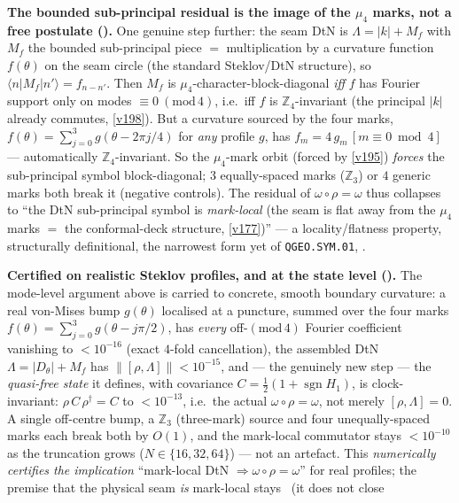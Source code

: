\documentclass[11pt,a4paper]{article}
\newcommand{\Z}{\mathbb Z}
\begin{document}
\begin{keybox}
\par\smallskip\noindent\textbf{The bounded sub-principal residual is the image of the $\mu_4$ marks, not a
free postulate ().} One genuine step further: the seam DtN is
$\Lambda=|k|+M_f$ with $M_f$ the bounded sub-principal piece $=$ multiplication by a curvature function
$f(\theta)$ on the seam circle (the standard Steklov/DtN structure), so $\langle n|M_f|n'\rangle=f_{n-n'}$.
Then $M_f$ is $\mu_4$-character-block-diagonal \emph{iff} $f$ has Fourier support only on modes
$\equiv0\ (\mathrm{mod}\,4)$, i.e.\ iff $f$ is $\Z_4$-invariant (the principal $|k|$ already commutes,
\vref{v198}). But a curvature sourced by the four marks, $f(\theta)=\sum_{j=0}^{3}g(\theta-2\pi j/4)$ for
\emph{any} profile $g$, has $f_m=4\,g_m\,[m\equiv0\bmod4]$ --- automatically $\Z_4$-invariant. So the
$\mu_4$-mark orbit (forced by \vref{v195}) \emph{forces} the sub-principal symbol block-diagonal; $3$
equally-spaced marks ($\Z_3$) or $4$ generic marks both break it (negative controls). The residual of
$\omega\circ\rho=\omega$ thus collapses to ``the DtN sub-principal symbol is \emph{mark-local} (the seam is
flat away from the $\mu_4$ marks $=$ the conformal-deck structure, \vref{v177})'' --- a locality/flatness
property, structurally definitional, the narrowest form yet of \texttt{QGEO.SYM.01}, \mO.
\par\smallskip\noindent\textbf{Certified on realistic Steklov profiles, and at the state level
().} The mode-level argument above is carried to concrete, smooth boundary
curvature: a real von-Mises bump $g(\theta)$ localised at a puncture, summed over the four marks
$f(\theta)=\sum_{j=0}^{3}g(\theta-j\pi/2)$, has \emph{every} off-$(\mathrm{mod}\,4)$ Fourier coefficient
vanishing to $<10^{-16}$ (exact $4$-fold cancellation), the assembled DtN $\Lambda=|D_\theta|+M_f$ has
$\|[\rho,\Lambda]\|<10^{-15}$, and --- the genuinely new step --- the \emph{quasi-free state} it defines,
with covariance $C=\tfrac12(1+\operatorname{sgn}H_1)$, is clock-invariant: $\rho\,C\,\rho^\dagger=C$ to
$<10^{-13}$, i.e.\ the actual $\omega\circ\rho=\omega$, not merely $[\rho,\Lambda]=0$. A single off-centre
bump, a $\Z_3$ (three-mark) source and four unequally-spaced marks each break both by $O(1)$, and the
mark-local commutator stays $<10^{-10}$ as the truncation grows ($N\in\{16,32,64\}$) --- not an artefact.
This \emph{numerically certifies the implication} ``mark-local DtN $\Rightarrow\omega\circ\rho=\omega$'' for
real profiles; the premise that the physical seam \emph{is} mark-local stays \mO\ (it does not close

\end{keybox}
\end{document}

